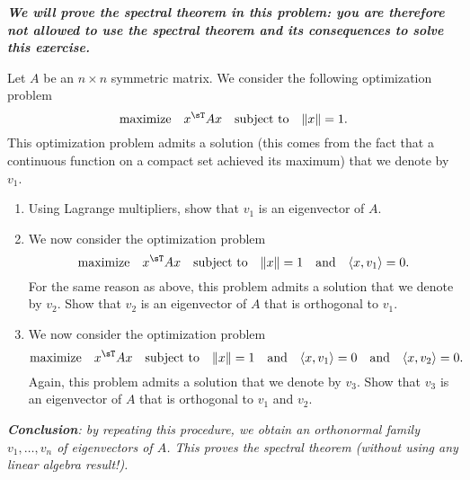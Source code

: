 \documentclass[11pt,nocut]{article}
\begin{document}
\newpage

\begin{problem}[3 points]
	\emph{\textbf{We will prove the spectral theorem in this problem: you are therefore not allowed to use the spectral theorem and its consequences to solve this exercise.}}

	Let $A$ be an $n \times n$ symmetric matrix. We consider the following optimization problem
	\begin{equation}\label{eq:eig1}
		\text{maximize} \quad x^{\sT} A x \quad \text{subject to} \quad \|x\| = 1.
	\end{equation}
	This optimization problem admits a solution (this comes from the fact that a continuous function on a compact set achieved its maximum) that we denote by $v_1$.
	\begin{enumerate}[label=\normalfont(\textbf{\alph*})]
		\item Using Lagrange multipliers, show that $v_1$ is an eigenvector of $A$.
		\item We now consider the optimization problem
	\begin{equation}\label{eq:eig2}
		\text{maximize} \quad x^{\sT} A x \quad \text{subject to} \quad \|x\| = 1
		\quad \text{and} \quad \langle x,v_1 \rangle = 0.
	\end{equation}
	For the same reason as above, this problem admits a solution that we denote by $v_2$. Show that $v_2$ is an eigenvector of $A$ that is orthogonal to $v_1$.
		\item We now consider the optimization problem
	\begin{equation}\label{eq:eig3}
		\text{maximize} \quad x^{\sT} A x \quad \text{subject to} \quad \|x\| = 1
		\quad \text{and} \quad \langle x,v_1 \rangle = 0
		\quad \text{and} \quad \langle x,v_2 \rangle = 0.
	\end{equation}
	Again, this problem admits a solution that we denote by $v_3$. Show that $v_3$ is an eigenvector of $A$ that is orthogonal to $v_1$ and $v_2$.
	\end{enumerate}
	\emph{
		\textbf{Conclusion}: by repeating this procedure, we obtain an orthonormal family $v_1, \dots, v_n$ of eigenvectors of $A$. This proves the spectral theorem (without using any linear algebra result!).
	}
\end{problem}


\vspace{5mm}
\end{document}
